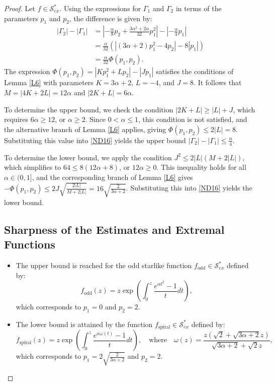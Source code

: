 \documentclass[10pt,a4paper]{amsart}
\numberwithin{equation}{section}
\begin{document}
\begin{proof}
Let $f \in \mathcal{S}_{ex}^{\ast}$. Using the expressions for $\Gamma_1$ and $\Gamma_2$ in terms of the parameters $p_1$ and $p_2$, the difference is given by:
\begin{align}
|\Gamma_2| - |\Gamma_1|
&= \left| -\frac{\alpha}{8}p_2 + \frac{3\alpha^2+2\alpha}{32}p_1^2 \right| - \left| -\frac{\alpha}{4}p_1 \right| \nonumber \\
&= \frac{\alpha}{32}\left( |(3\alpha+2)p_1^2 - 4p_2| - 8|p_1| \right) \nonumber \\
&= \frac{\alpha}{32}\Phi(p_1, p_2).
\label{ND16}
\end{align}
The expression $\Phi(p_1, p_2) = |Kp_1^2 + Lp_2| - |Jp_1|$ satisfies the conditions of Lemma \ref{L6} with parameters $K = 3\alpha+2$, $L = -4$, and $J = 8$. It follows that $M = |4K + 2L| = 12\alpha$ and $|2K + L| = 6\alpha$.

To determine the upper bound, we check the condition $|2K + L| \ge |L| + J$, which requires $6\alpha \ge 12$, or $\alpha \ge 2$. Since $0 < \alpha \le 1$, this condition is not satisfied, and the alternative branch of Lemma \ref{L6} applies, giving $\Phi(p_1, p_2) \le 2|L| = 8$. Substituting this value into \eqref{ND16} yields the upper bound $|\Gamma_2| - |\Gamma_1| \le \frac{\alpha}{4}$.

To determine the lower bound, we apply the condition $J^2 \le 2|L|(M + 2|L|)$, which simplifies to $64 \le 8(12\alpha + 8)$, or $12\alpha \ge 0$. This inequality holds for all $\alpha \in (0,1]$, and the corresponding branch of Lemma \ref{L6} gives $-\Phi(p_1, p_2) \le 2J \sqrt{\frac{2|L|}{M + 2|L|}} = 16\sqrt{\frac{2}{3\alpha + 2}}$. Substituting this into \eqref{ND16} yields the lower bound.
\subsection*{Sharpness of the Estimates and Extremal Functions}
\begin{itemize}
\item The upper bound is reached for the odd starlike function $f_{\text{odd}} \in \mathcal{S}_{ex}^{\ast}$ defined by:
\[
f_{\text{odd}}(z) = z\exp\left(\int_0^z \frac{e^{\alpha t^2}-1}{t}dt\right),
\]
which corresponds to $p_1=0$ and $p_2=2$. 

\item The lower bound is attained by the function $f_{\text{spiral}} \in \mathcal{S}_{ex}^{\ast}$ defined by:
\[
f_{\text{spiral}}(z) = z\exp\left(\int_0^z \frac{e^{\alpha \omega(t)}-1}{t}dt\right), \quad \text{where} \quad \omega(z)=\frac{z\left(\sqrt{2}+\sqrt{3\alpha+2}z\right)}{\sqrt{3\alpha+2}+\sqrt{2}z},
\]
which corresponds to $p_1=2\sqrt{\frac{2}{3\alpha+2}}$ and $p_2=2$.
\end{itemize}
\end{proof}
\end{document}
